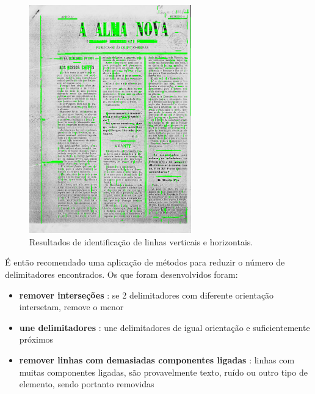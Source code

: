 \begin{figure}[H]
	\centering
	\includegraphics[width=7cm]{images/ilustracoes/get_delimiters_all_lines_example.png}
	\caption{Resultados de identificação de linhas verticais e horizontais.}
	\label{fig:get_delimiters_all_lines_example}
\end{figure}



É então recomendado uma aplicação de métodos para reduzir o número de delimitadores encontrados.
Os que foram desenvolvidos foram:

\begin{itemize}\setlength\itemsep{-0.3em}
	\vspace{-0.5em}
	\item \textbf{remover interseções} : se 2 delimitadores com diferente orientação intersetam, remove o menor
	\item \textbf{une delimitadores} : une delimitadores de igual orientação e suficientemente próximos
	\item \textbf{remover linhas com demasiadas componentes ligadas} : linhas com muitas componentes ligadas, são provavelmente texto, ruído ou outro tipo de elemento, sendo portanto removidas
\end{itemize}

